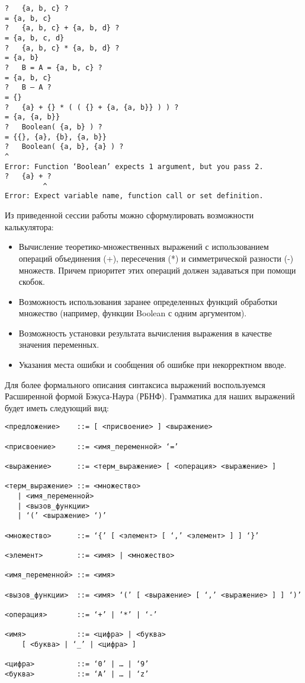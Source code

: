 \documentclass[a4paper,12pt]{article}
\begin{document}
\begin{verbatim}
?   {a, b, c} ?
= {a, b, c}
?   {a, b, c} + {a, b, d} ?
= {a, b, c, d}
?   {a, b, c} * {a, b, d} ?
= {a, b}
?   B = A = {a, b, c} ?
= {a, b, c}
?   B – A ?
= {}
?   {a} + {} * ( ( {} + {a, {a, b}} ) ) ?
= {a, {a, b}}
?   Boolean( {a, b} ) ?
= {{}, {a}, {b}, {a, b}}
?   Boolean( {a, b}, {a} ) ?
^       
Error: Function ‘Boolean’ expects 1 argument, but you pass 2.
?   {a} + ?
         ^
Error: Expect variable name, function call or set definition.
\end{verbatim}

Из приведенной сессии работы можно сформулировать возможности калькулятора:

\begin{itemize}
\item Вычисление теоретико-множественных выражений с использованием
  операций объединения (+), пересечения (*) и симметрической разности
  (-) множеств. Причем приоритет этих операций должен задаваться при
  помощи скобок.
\item Возможность использования заранее определенных функций обработки
  множество (например, функции Boolean с одним аргументом).
\item Возможность установки результата вычисления выражения в качестве
  значения переменных.
\item Указания места ошибки и сообщения об ошибке при некорректном вводе.
\end{itemize}

Для более формального описания синтаксиса выражений воспользуемся
Расширенной формой Бэкуса-Наура (РБНФ). Грамматика для наших выражений
будет иметь следующий вид:

\begin{verbatim}
<предложение>    ::= [ <присвоение> ] <выражение>

<присвоение>     ::= <имя_переменной> ‘=’

<выражение>      ::= <терм_выражение> [ <операция> <выражение> ]

<терм_выражение> ::= <множество>
   | <имя_переменной>
   | <вызов_функции>
   | ‘(’ <выражение> ‘)’

<множество>      ::= ‘{’ [ <элемент> [ ‘,’ <элемент> ] ] ‘}’

<элемент>        ::= <имя> | <множество>

<имя_переменной> ::= <имя>

<вызов_функции>  ::= <имя> ‘(’ [ <выражение> [ ‘,’ <выражение> ] ] ‘)’

<операция>       ::= ‘+’ | ‘*’ | ‘-’ 

<имя>            ::= <цифра> | <буква>
    [ <буква> | ‘_’ | <цифра> ]

<цифра>          ::= ‘0’ | … | ‘9’
<буква>          ::= ‘A’ | … | ‘z’
\end{verbatim}
\end{document}
